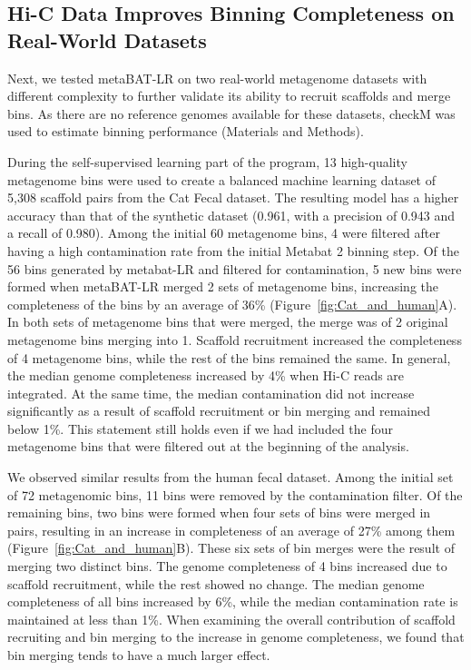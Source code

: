 \documentclass[fleqn,10pt,lineno]{wlpeerj}
\begin{document}
\subsection*{Hi-C Data Improves Binning Completeness on Real-World Datasets}

Next, we tested metaBAT-LR on two real-world metagenome datasets with different complexity to further validate its ability to recruit scaffolds and merge bins. As there are no reference genomes available for these datasets, checkM was used to estimate binning performance (Materials and Methods). 

During the self-supervised learning part of the program, 13 high-quality metagenome bins were used to create a balanced machine learning dataset of 5,308 scaffold pairs from the Cat Fecal dataset. The resulting model has a higher accuracy than that of the synthetic dataset (0.961, with a precision of 0.943 and a recall of 0.980). Among the initial 60 metagenome bins, 4 were filtered after having a high contamination rate from the initial Metabat 2 binning step. Of the 56 bins generated by metabat-LR and filtered for contamination, 5 new bins were formed when metaBAT-LR merged 2 sets of metagenome bins, increasing the completeness of the bins by an average of 36\% (Figure~\ref{fig:Cat_and_human}A). In both sets of metagenome bins that were merged, the merge was of 2 original metagenome bins merging into 1. Scaffold recruitment increased the completeness of 4 metagenome bins, while the rest of the bins remained the same. In general, the median genome completeness increased by 4\% when Hi-C reads are integrated. At the same time, the median contamination did not increase significantly as a result of scaffold recruitment or bin merging and remained below 1\%. This statement still holds even if we had included the four metagenome bins that were filtered out at the beginning of the analysis.     

We observed similar results from the human fecal dataset. Among the initial set of 72 metagenomic bins, 11 bins were removed by the contamination filter. Of the remaining bins, two bins were formed when four sets of bins were merged in pairs, resulting in an increase in completeness of an average of 27\% among them (Figure~\ref{fig:Cat_and_human}B). These six sets of bin merges were the result of merging two distinct bins. The genome completeness of 4 bins increased due to scaffold recruitment, while the rest showed no change. The median genome completeness of all bins increased by 6\%, while the median contamination rate is maintained at less than 1\%. When examining the overall contribution of scaffold recruiting and bin merging to the increase in genome completeness, we found that bin merging tends to have a much larger effect.
\end{document}
